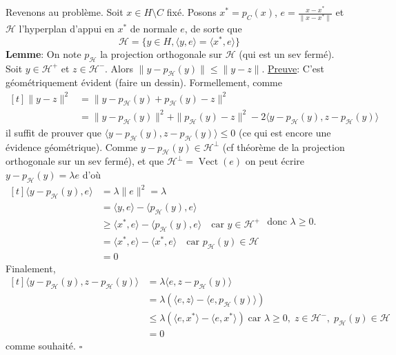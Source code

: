 \documentclass{report}
\begin{document}
\noindent Revenons au problème. Soit $x\in H\setminus C$ fixé. Posons $x^*=p_C(x)$, $e=\frac{x-x^*}{\|x-x^*\|}$ et $\mathcal H$ l'hyperplan d'appui en $x^*$ de normale $e$, de sorte que $$\mathcal H=\{y\in H, \langle y,e\rangle = \langle x^*,e\rangle\}$$
\textbf{Lemme}: On note $p_{\mathcal H}$ la projection orthogonale sur $\mathcal H$ (qui est un sev fermé). Soit $y\in \mathcal H^+$ et $z\in \mathcal H^-$. Alors $\|y-p_{\mathcal H}(y)\|\leq \|y-z\|$.  \newline \newline
\underline{Preuve}: C'est géométriquement évident (faire un dessin). Formellement, comme 
$\begin{aligned}[t]\|y-z\|^2&=\|y-p_{\mathcal H}(y) + p_{\mathcal H}(y)-z\|^2 \\
&= \|y-p_{\mathcal H}(y)\|^2 + \|p_{\mathcal H}(y)-z\|^2 -2\langle y-p_{\mathcal H}(y), z-p_{\mathcal H}(y)\rangle
\end{aligned}$\newline
il suffit de prouver que $\langle y-p_{\mathcal H}(y), z-p_{\mathcal H}(y)\rangle \leq 0$ (ce qui est encore une évidence géométrique).\newline
Comme $y-p_{\mathcal H}(y)\in \mathcal H^\bot$ (cf théorème de la projection orthogonale sur un sev fermé), et que $\mathcal H^{\bot}=\operatorname{Vect}(e)$ on peut écrire \newline
$y-p_{\mathcal H}(y) = \lambda e$ d'où $\begin{aligned}[t]\langle y-p_{\mathcal H}(y), e\rangle &= \lambda \|e\|^2=\lambda\\ 
&= \langle y, e\rangle - \langle p_{\mathcal H}(y), e\rangle \\
&\geq \langle x^*, e\rangle - \langle p_{\mathcal H}(y), e\rangle \quad \text{car }y\in \mathcal H^+ \\
&= \langle x^*, e\rangle - \langle x^*, e\rangle \quad \text{car }p_{\mathcal H}(y)\in \mathcal H \\
&= 0 \end{aligned} $\newline 
donc $\lambda \geq 0$.\newline
Finalement, $\begin{aligned}[t] \langle y-p_{\mathcal H}(y), z-p_{\mathcal H}(y)\rangle &= \lambda \langle e, z-p_{\mathcal H}(y) \rangle \\
&= \lambda \left( \langle e, z\rangle - \langle e, p_{\mathcal H}(y) \rangle \right)\\
&\leq \lambda \left( \langle e, x^*\rangle - \langle e, x^* \rangle \right) \; \text{car } \lambda\geq 0,\; z\in \mathcal H^-, \;p_{\mathcal H}(y)\in \mathcal H \\
&= 0
\end{aligned}$\newline
comme souhaité. \null \hfill $\square$\\
\end{document}
